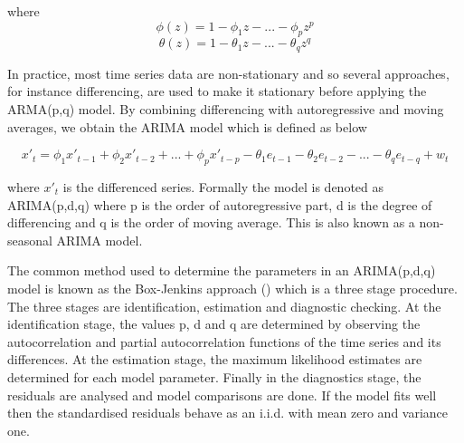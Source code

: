 where
        \begin{equation}
            \phi(z) = 1 - \phi_{1}z - ... - \phi_{p}z^{p}
        \end{equation}
        \begin{equation}
            \theta(z) = 1 - \theta_{1}z - ... - \theta_{q}z^{q}
        \end{equation}

In practice, most time series data are non-stationary and so several approaches, for instance
differencing, are used to make it stationary before applying the ARMA(p,q) model. By
combining differencing with autoregressive and moving averages, we obtain the ARIMA model which is
defined as below

        \begin{equation} \label{eq:arima}
          x'_{t} = \phi_{1}x'_{t-1} + \phi_{2}x'_{t-2} + ... + \phi_{p}x'_{t-p} -
          \theta_{1}e_{t-1} - \theta_{2}e_{t-2} - ... - \theta_{q}e_{t-q} + w_{t}
        \end{equation}

where $x'_{t}$ is the differenced series. Formally the model is denoted as ARIMA(p,d,q) where p
is the order of autoregressive part, d is the degree of differencing and q is the order of moving
average. This is also known as a non-seasonal ARIMA model.

The common method used to determine the parameters in an ARIMA(p,d,q) model is known as the
Box-Jenkins approach (\citet{box2015time}) which is a three stage procedure. The three stages are
identification, estimation and diagnostic checking. At the identification stage, the values p, d
and q are determined by observing the autocorrelation and partial autocorrelation functions of
the time series and its differences. At the estimation stage, the maximum likelihood estimates are
determined for each model parameter. Finally in the diagnostics stage, the residuals are analysed
and model comparisons are done. If the model fits well then the standardised residuals behave as
an i.i.d. with mean zero and variance one.


